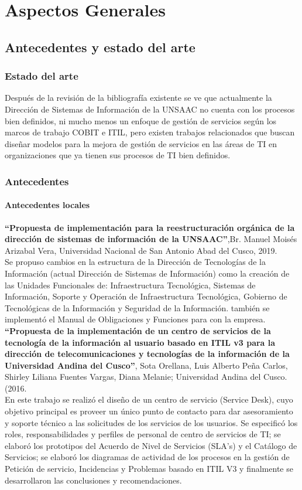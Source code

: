 \chapter{Aspectos Generales}
\section{Antecedentes y estado del arte}
\subsection{Estado del arte}
Después de la revisión de la bibliografía existente se ve que actualmente la Dirección de Sistemas de Información de la UNSAAC no cuenta con los procesos bien definidos, ni mucho menos un enfoque de gestión de servicios según los marcos de trabajo COBIT e ITIL, pero existen trabajos relacionados que buscan diseñar modelos para la mejora de gestión de servicios en las áreas de TI en organizaciones que ya tienen sus procesos de TI bien definidos.
\subsection{Antecedentes}
\subsubsection{Antecedentes locales}
\textbf{``Propuesta de implementación para la reestructuración orgánica de la dirección de sistemas de información de la UNSAAC''},Br. Manuel Moisés Arizabal Vera, Universidad Nacional de San Antonio Abad del Cusco, 2019.\\[2pt]
Se propuso cambios en la estructura de la Dirección de Tecnologías de la Información (actual Dirección de Sistemas de Información) como la creación de las Unidades Funcionales de: Infraestructura Tecnológica, Sistemas de Información, Soporte y Operación de Infraestructura Tecnológica, Gobierno de Tecnológicas de la Información y Seguridad de la Información. también se implementó el Manual de Obligaciones y Funciones para con la empresa.\\

\textbf{``Propuesta de la implementación de un centro de servicios de la tecnología de la información al usuario basado en ITIL v3 para la dirección de telecomunicaciones y tecnologías de la información de la Universidad Andina del Cusco''}, Sota Orellana, Luis Alberto Peña Carlos, Shirley Liliana Fuentes Vargas, Diana Melanie; Universidad Andina del Cusco. (2016.\\[2pt]
En este trabajo se realizó el diseño de un centro de servicio (Service Desk), cuyo objetivo principal es proveer un único punto de contacto para dar asesoramiento y soporte técnico a las solicitudes de los servicios de los usuarios. Se especificó los roles, responsabilidades y perfiles de personal de centro de servicios de TI; se elaboró los prototipos del Acuerdo de Nivel de Servicios (SLA’s) y el Catálogo de Servicios; se elaboró los diagramas de actividad de los procesos en la gestión de Petición de servicio, Incidencias y Problemas basado en ITIL V3 y finalmente se desarrollaron las conclusiones y recomendaciones.\\

